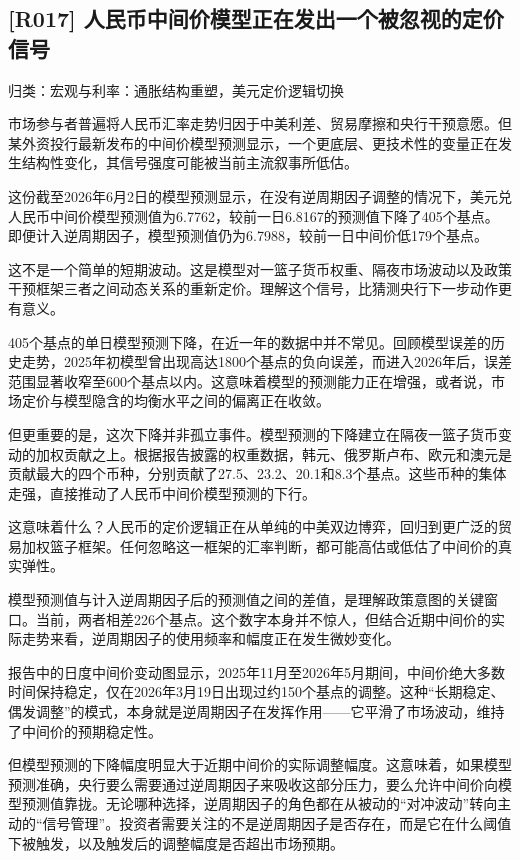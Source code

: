 \documentclass[11pt]{ctexart}
\begin{document}
\subsection{[R017] 人民币中间价模型正在发出一个被忽视的定价信号}
{\small\color{refgray}归类：宏观与利率：通胀结构重塑，美元定价逻辑切换}

市场参与者普遍将人民币汇率走势归因于中美利差、贸易摩擦和央行干预意愿。但某外资投行最新发布的中间价模型预测显示，一个更底层、更技术性的变量正在发生结构性变化，其信号强度可能被当前主流叙事所低估。

这份截至2026年6月2日的模型预测显示，在没有逆周期因子调整的情况下，美元兑人民币中间价模型预测值为6.7762，较前一日6.8167的预测值下降了405个基点。即便计入逆周期因子，模型预测值仍为6.7988，较前一日中间价低179个基点。

这不是一个简单的短期波动。这是模型对一篮子货币权重、隔夜市场波动以及政策干预框架三者之间动态关系的重新定价。理解这个信号，比猜测央行下一步动作更有意义。

405个基点的单日模型预测下降，在近一年的数据中并不常见。回顾模型误差的历史走势，2025年初模型曾出现高达1800个基点的负向误差，而进入2026年后，误差范围显著收窄至600个基点以内。这意味着模型的预测能力正在增强，或者说，市场定价与模型隐含的均衡水平之间的偏离正在收敛。

但更重要的是，这次下降并非孤立事件。模型预测的下降建立在隔夜一篮子货币变动的加权贡献之上。根据报告披露的权重数据，韩元、俄罗斯卢布、欧元和澳元是贡献最大的四个币种，分别贡献了27.5、23.2、20.1和8.3个基点。这些币种的集体走强，直接推动了人民币中间价模型预测的下行。

这意味着什么？人民币的定价逻辑正在从单纯的中美双边博弈，回归到更广泛的贸易加权篮子框架。任何忽略这一框架的汇率判断，都可能高估或低估了中间价的真实弹性。

模型预测值与计入逆周期因子后的预测值之间的差值，是理解政策意图的关键窗口。当前，两者相差226个基点。这个数字本身并不惊人，但结合近期中间价的实际走势来看，逆周期因子的使用频率和幅度正在发生微妙变化。

报告中的日度中间价变动图显示，2025年11月至2026年5月期间，中间价绝大多数时间保持稳定，仅在2026年3月19日出现过约150个基点的调整。这种“长期稳定、偶发调整”的模式，本身就是逆周期因子在发挥作用——它平滑了市场波动，维持了中间价的预期稳定性。

但模型预测的下降幅度明显大于近期中间价的实际调整幅度。这意味着，如果模型预测准确，央行要么需要通过逆周期因子来吸收这部分压力，要么允许中间价向模型预测值靠拢。无论哪种选择，逆周期因子的角色都在从被动的“对冲波动”转向主动的“信号管理”。投资者需要关注的不是逆周期因子是否存在，而是它在什么阈值下被触发，以及触发后的调整幅度是否超出市场预期。
\end{document}
